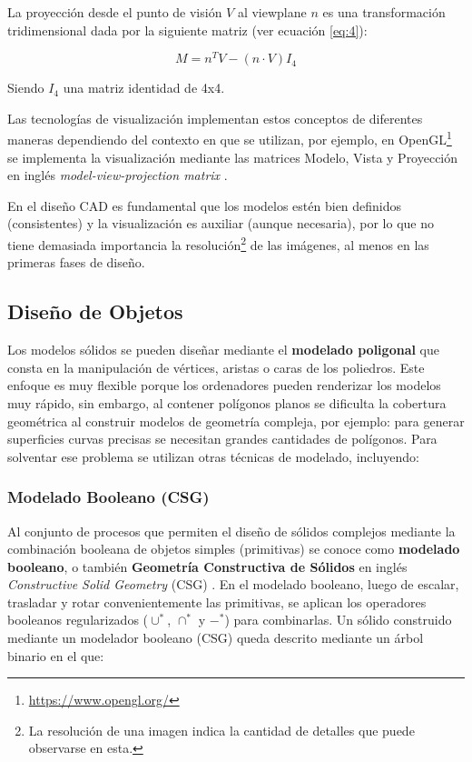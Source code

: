 La proyección desde el punto de visión $V$ al viewplane $n$ es una transformación tridimensional dada por la siguiente matriz \citep{marsh2005applied} (ver ecuación \ref{eq:4}):

\begin{equation}
M = n^TV - (n  · V)I_4
\label{eq:4}
\end{equation}

Siendo $I_4$ una matriz identidad de 4x4.

\vspace{5mm}

Las tecnologías de visualización implementan estos conceptos de diferentes maneras dependiendo del contexto en que se utilizan, por ejemplo, en \Gls{OpenGL}\footnote{\url{https://www.opengl.org/}} se implementa la visualización mediante las matrices Modelo, Vista y Proyección en inglés \textit{model-view-projection matrix} \citep{kessenich2016opengl}.

En el diseño CAD es fundamental que los modelos estén bien definidos (consistentes) y la visualización es auxiliar (aunque necesaria), por lo que no tiene demasiada importancia la resolución\footnote{La resolución de una imagen indica la cantidad de detalles que puede observarse en esta. } de las imágenes, al menos en las primeras fases de diseño.\newline




\subsection{Diseño de Objetos} 
\label{sectionDisenoObjetos}
\label{disGeo}

Los modelos sólidos se pueden diseñar mediante el \textbf{modelado poligonal} \citep{russo2010polygonal} que consta en la manipulación de vértices, aristas o caras de los poliedros. Este enfoque es muy  flexible porque los ordenadores pueden renderizar los modelos muy rápido, sin embargo, al contener polígonos planos se dificulta la cobertura geométrica al construir modelos de geometría compleja, por ejemplo: para generar superficies curvas precisas se necesitan grandes cantidades de polígonos. Para solventar ese problema se utilizan otras técnicas de modelado, incluyendo:

\subsubsection{Modelado Booleano (CSG) }
\label{mod:booleano}
Al conjunto de procesos que permiten el diseño de sólidos complejos mediante la combinación booleana de objetos simples (primitivas) se conoce como \textbf{modelado booleano}, o también  \textbf{Geometría Constructiva de Sólidos} en inglés \textit{Constructive Solid Geometry} (\Gls{CSG}) \citep{foley1996computer}.\newline
En el modelado booleano, luego de escalar, trasladar y rotar convenientemente las primitivas, se aplican los operadores booleanos regularizados  ($\cup^*$, $\cap^*$ y $-^*$) para combinarlas. Un sólido construido mediante un modelador booleano (CSG) queda descrito mediante un árbol binario en el que:

